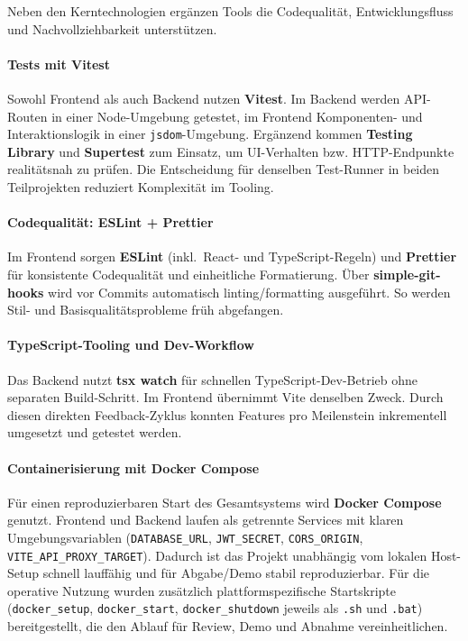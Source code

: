 Neben den Kerntechnologien ergänzen Tools die Codequalität,
Entwicklungsfluss und Nachvollziehbarkeit unterstützen.

\paragraph{Tests mit Vitest}
Sowohl Frontend als auch Backend nutzen \textbf{Vitest}.
Im Backend werden API-Routen in einer Node-Umgebung getestet, im Frontend
Komponenten- und Interaktionslogik in einer \texttt{jsdom}-Umgebung.
Ergänzend kommen \textbf{Testing Library} und \textbf{Supertest} zum Einsatz,
um UI-Verhalten bzw. HTTP-Endpunkte realitätsnah zu prüfen.
Die Entscheidung für denselben Test-Runner in beiden Teilprojekten reduziert
Komplexität im Tooling.

\paragraph{Codequalität: ESLint + Prettier}
Im Frontend sorgen \textbf{ESLint} (inkl.\ React- und TypeScript-Regeln) und
\textbf{Prettier} für konsistente Codequalität und einheitliche Formatierung.
Über \textbf{simple-git-hooks} wird vor Commits automatisch linting/formatting
ausgeführt.
So werden Stil- und Basisqualitätsprobleme früh abgefangen.

\paragraph{TypeScript-Tooling und Dev-Workflow}
Das Backend nutzt \textbf{tsx watch} für schnellen TypeScript-Dev-Betrieb ohne
separaten Build-Schritt.
Im Frontend übernimmt Vite denselben Zweck.
Durch diesen direkten Feedback-Zyklus konnten Features pro Meilenstein
inkrementell umgesetzt und getestet werden.

\paragraph{Containerisierung mit Docker Compose}
Für einen reproduzierbaren Start des Gesamtsystems wird \textbf{Docker Compose}
genutzt.
Frontend und Backend laufen als getrennte Services mit klaren Umgebungsvariablen
(\texttt{DATABASE\_URL}, \texttt{JWT\_SECRET}, \texttt{CORS\_ORIGIN},
\texttt{VITE\_API\_PROXY\_TARGET}).
Dadurch ist das Projekt unabhängig vom lokalen Host-Setup schnell lauffähig und
für Abgabe/Demo stabil reproduzierbar.
Für die operative Nutzung wurden zusätzlich plattformspezifische
Startskripte (\texttt{docker\_setup}, \texttt{docker\_start},
\texttt{docker\_shutdown} jeweils als \texttt{.sh} und \texttt{.bat})
bereitgestellt, die den Ablauf für Review, Demo und Abnahme vereinheitlichen.
